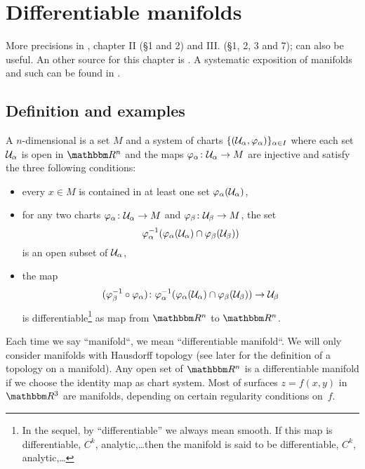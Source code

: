 
\section{Differentiable manifolds}

More precisions in \cite{kobayashi}, chapter II (\S 1 and 2) and III. (\S 1, 2, 3 and 7); \cite{madore,Helgason} can also be useful. An other source for this chapter is \cite{ms_book}. A systematic exposition of manifolds and such can be found in \cite{dgbook}.

\subsection{Definition and examples}

A $n$-dimensional  is a set $M$ and a system of charts $\{(\mathcal{U}_{\alpha},\varphi_{\alpha})\}_{\alpha\in I}$ where each set $\mathcal{U}_{\alpha}$ is open in $\eR^n$ and the maps $\varphi_{\alpha}\colon \mathcal{U}_{\alpha}\to M$ are injective and satisfy the three following conditions:

\begin{itemize}
\item every $x\in M$ is contained in at least one set $\varphi_{\alpha}(\mathcal{U}_{\alpha})$,
\item for any two charts $\varphi_{\alpha}\colon \mathcal{U}_{\alpha}\to M$ and $\varphi_{\beta}\colon \mathcal{U}_{\beta}\to M$, the set
\[
   \varphi_{\alpha}^{-1}( \varphi_{\alpha}(\mathcal{U}_{\alpha})\cap\varphi_{\beta}(\mathcal{U}_{\beta}) )
\]
is an open subset of $\mathcal{U}_{\alpha}$, 
\item the map
\[
   (\varphi_{\beta}^{-1}\circ\varphi_{\alpha})  \colon    \varphi_{\alpha}^{-1}( \varphi_{\alpha}(\mathcal{U}_{\alpha})\cap\varphi_{\beta}(\mathcal{U}_{\beta})  )   \to \mathcal{U}_{\beta}
\]
is differentiable\footnote{In the sequel, by ``differentiable'' we always mean smooth. If this map is differentiable, $C^k$, analytic,\ldots then the manifold is said to be differentiable, $C^k$, analytic,\ldots} as map from $\eR^n$ to $\eR^n$.

\end{itemize}

Each time we say ``manifold``, we mean ``differentiable manifold``. We will only consider manifolds with Hausdorff topology (see later for the definition of a topology on a manifold). Any open set of $\eR^n$ is a differentiable manifold if we choose the identity map as chart system. Most of surfaces $z=f(x,y)$ in $\eR^3$ are manifolds, depending on certain regularity conditions on~$f$. 

